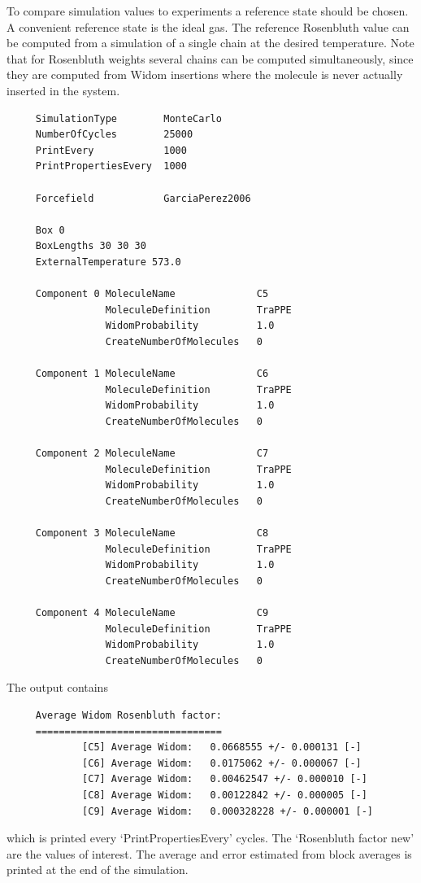 To compare simulation values to experiments a reference state should be chosen. A convenient reference state
is the ideal gas. The reference Rosenbluth value can be computed from a simulation of a single chain at the
desired temperature. Note that for Rosenbluth weights several chains can be computed simultaneously, since
they are computed from Widom insertions where the molecule is never actually inserted in the system.

\begin{tiny}
\begin{verbatim}
     SimulationType        MonteCarlo
     NumberOfCycles        25000
     PrintEvery            1000
     PrintPropertiesEvery  1000
     
     Forcefield            GarciaPerez2006
     
     Box 0
     BoxLengths 30 30 30
     ExternalTemperature 573.0
     
     Component 0 MoleculeName              C5
                 MoleculeDefinition        TraPPE
                 WidomProbability          1.0
                 CreateNumberOfMolecules   0
     
     Component 1 MoleculeName              C6
                 MoleculeDefinition        TraPPE
                 WidomProbability          1.0
                 CreateNumberOfMolecules   0
     
     Component 2 MoleculeName              C7
                 MoleculeDefinition        TraPPE
                 WidomProbability          1.0
                 CreateNumberOfMolecules   0
     
     Component 3 MoleculeName              C8
                 MoleculeDefinition        TraPPE
                 WidomProbability          1.0
                 CreateNumberOfMolecules   0
     
     Component 4 MoleculeName              C9
                 MoleculeDefinition        TraPPE
                 WidomProbability          1.0
                 CreateNumberOfMolecules   0
\end{verbatim}
\end{tiny}
\noindent
The output contains 
\begin{tiny}
\begin{verbatim}
     Average Widom Rosenbluth factor:
     ================================
             [C5] Average Widom:   0.0668555 +/- 0.000131 [-]
             [C6] Average Widom:   0.0175062 +/- 0.000067 [-]
             [C7] Average Widom:   0.00462547 +/- 0.000010 [-]
             [C8] Average Widom:   0.00122842 +/- 0.000005 [-]
             [C9] Average Widom:   0.000328228 +/- 0.000001 [-]
\end{verbatim}
\end{tiny}
which is printed every `PrintPropertiesEvery' cycles. The `Rosenbluth factor new' are the values of interest.
The average and error estimated from block averages is printed at the end
of the simulation.


